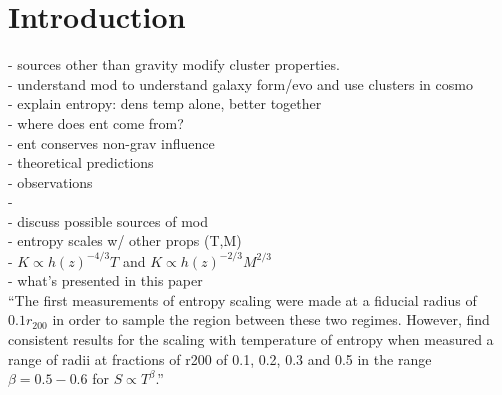 \documentclass[iop]{emulateapj-rtx4}
\begin{document}
\title{\mytitle}
\shorttitle{\mystitle}
\author{
  K. W. Cavagnolo
  G. M. Voit,
  S. Bruch,
  M. Donahue,
  and M. Sun
}


\begin{abstract}
  Using archival data for a sample of \clnum\ galaxy clusters observed
  with the \chandra\ X-ray Observatory, we investigate the entropy
  scaling properties of the intracluster medium (ICM).
\end{abstract}


\keywords{\mykeywords}

\section{Introduction}
\label{sec:intro}

- sources other than gravity modify cluster properties.\\
- understand mod to understand galaxy form/evo and use clusters in
cosmo\\
- explain entropy: dens temp alone, better together\\
- where does ent come from?\\
- ent conserves non-grav influence\\
- theoretical predictions\\
- observations\\
- \citet{accept}\\
- discuss possible sources of mod\\
- entropy scales w/ other props (T,M)\\
- $K \propto h(z)^{-4/3} T$ and $K \propto h(z)^{-2/3} M^{2/3}$\\
- what's presented in this paper\\

``The first measurements of entropy scaling were made at a fiducial
radius of $0.1r_{200}$ \citep{1999Natur.397..135P,davies00} in order
to sample the region between these two regimes. However,
\citet{pratt06} find consistent results for the scaling with
temperature of entropy when measured a range of radii at fractions of
r200 of 0.1, 0.2, 0.3 and 0.5 in the range $\beta = 0.5-0.6$ for $S
\propto T^{\beta}$.''
\end{document}
